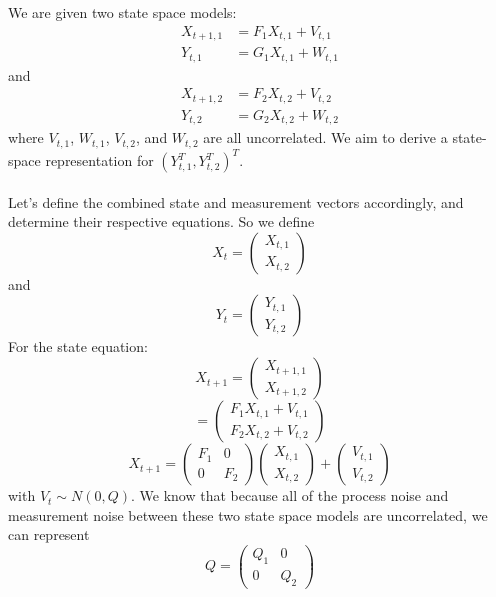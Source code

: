 \documentclass{article}
\begin{document}
{We are given two state space models:
\begin{align*}
  X_{t+1,1} &= F_1 X_{t,1} + V_{t,1} \\
  Y_{t,1} &= G_1 X_{t,1} + W_{t,1}
\end{align*}
and 
\begin{align*}
  X_{t+1,2} &= F_2 X_{t,2} + V_{t,2} \\
  Y_{t,2} &= G_2 X_{t,2} + W_{t,2}
\end{align*}
where \(V_{t,1}\), \(W_{t,1}\), \(V_{t,2}\), and \(W_{t,2}\) are all uncorrelated. We aim to derive a state-space representation for \((Y_{t,1}^T, Y_{t,2}^T)^T\). \\ \\
Let's define the combined state and measurement vectors accordingly, and determine their respective equations. So we define 
\[
  X_t = \begin{pmatrix}
    X_{t, 1} \\
    X_{t, 2}
  \end{pmatrix}
\]
and 
\[
  Y_t = \begin{pmatrix}
    Y_{t, 1} \\
    Y_{t, 2}
  \end{pmatrix}
\]
For the state equation:
\[
  X_{t+1} = \begin{pmatrix}
    X_{t+1, 1} \\
    X_{t+1, 2}
  \end{pmatrix}
\]
\[
  = \begin{pmatrix}
    F_1 X_{t,1} + V_{t,1} \\
    F_2 X_{t,2} + V_{t,2}
  \end{pmatrix}
\]
\[
  X_{t+1} = \begin{pmatrix}
    F_1 & 0 \\
    0 & F_2
  \end{pmatrix}
  \begin{pmatrix}
    X_{t,1} \\
    X_{t,2}
  \end{pmatrix} + 
  \begin{pmatrix}
    V_{t,1} \\
    V_{t,2}
  \end{pmatrix}
\]
with \(V_t \sim N(0, Q)\). We know that because all of the process noise and measurement noise between these two state space models are uncorrelated, we can represent 
\[
  Q = \begin{pmatrix}
    Q_1 & 0 \\
    0 & Q_2
  \end{pmatrix}
\]}
\end{document}
